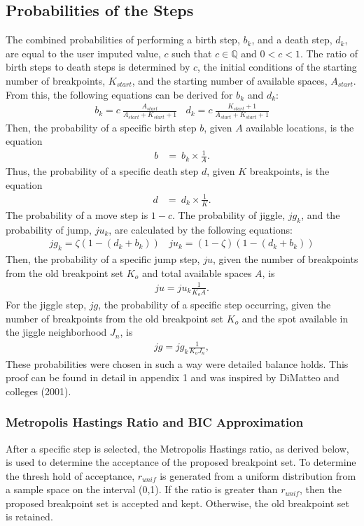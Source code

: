 \documentclass[submit]{smj}
\begin{document}
\subsection{Probabilities of the Steps}
The combined probabilities of performing a birth step, $b_k$, and a death step, $d_k$, are equal to the user imputed value, $c$ such that $c \in \mathbb{Q}$ and $0 < c < 1$. The ratio of birth steps to death steps is determined by $c$, the initial conditions of the starting number of breakpoints, $K_{start}$, and the starting number of available spaces, $A_{start}$. From this, the following equations can be derived for $b_k$ and $d_k$: 
\begin{align*}
b_k =  c \ \frac{A_{start}}{A_{start}+ K_{start}+1}  \ \ \ \ d_k =  c \  \frac{K_{start}+1}{A_{start}+ K_{start}+1}
\end{align*}
Then, the probability of a specific birth step $b$, given $A$ available locations, is the equation 
\begin{align*}
b &=  \ b_k \times \frac{1}{A}.
\end{align*}
Thus, the probability of a specific death step $d$, given $K$ breakpoints, is the equation
\begin{align*}
d &=  \ d_k \times \frac{1}{K}.
\end{align*}
The probability of a move step is $1-c$. The probability of jiggle, $jg_k$, and the probability of jump, $ju_k$, are calculated by the following equations: 
\begin{align*}
jg_k =\zeta (1-  (d_k + b_k))  \ \ \ \ ju_k =(1-\zeta)(1-(d_k + b_k)) 
\end{align*}
Then, the probability of a specific jump step, $ju$, given the number of breakpoints from the old breakpoint set $K_o$ and total available spaces $A$, is
\begin{align*}
ju =ju_k \frac{1}{K_{o} A}.  
\end{align*}
For the jiggle step, $jg$, the probability of a specific step occurring, given the number of breakpoints from the old breakpoint set $K_o$ and the spot available in the jiggle neighborhood $J_{n}$, is
\begin{align*}
jg= jg_k  \frac{1}{K_{o} J_{n}},
\end{align*}
These probabilities were chosen in such a way were detailed balance holds. This proof can be found in detail in appendix 1 and was inspired by DiMatteo and colleges (2001). 


\subsubsection{Metropolis Hastings Ratio and BIC Approximation} 
After a specific step is selected, the Metropolis Hastings ratio, as derived below, is used to determine the acceptance of the proposed breakpoint set. To determine the thresh hold of acceptance,  $r_{unif}$ is generated from a uniform distribution from a sample space on the interval (0,1). If the ratio is greater than $r_{unif}$, then the proposed breakpoint set is accepted and kept. Otherwise, the old breakpoint set is retained.
\end{document}
